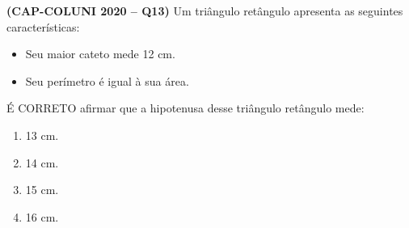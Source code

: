 \textbf{(CAP-COLUNI 2020 -- Q13)} Um triângulo retângulo apresenta as seguintes características:
\begin{itemize}
\item Seu maior cateto mede 12 cm.
\item Seu perímetro é igual à sua área.
\end{itemize}

É CORRETO afirmar que a hipotenusa desse triângulo retângulo mede:

\begin{enumerate}
	\item 13 cm.
	\item 14 cm.
	\item 15 cm.
	\item 16 cm.
\end{enumerate}
